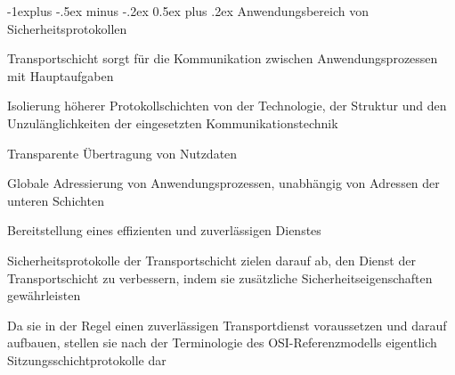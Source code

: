 \documentclass[a4paper]{article}
\makeatletter
\renewcommand{\subsection}{\@startsection{subsection}{2}{0mm}%
 {-1explus -.5ex minus -.2ex}%
 {0.5ex plus .2ex}%
 {\normalfont\normalsize\bfseries}}
\makeatother
\begin{document}
\begin{multicols}{3}
      \subsection{Anwendungsbereich von Sicherheitsprotokollen}
      \begin{itemize*}
            \item Transportschicht sorgt für die Kommunikation zwischen Anwendungsprozessen mit Hauptaufgaben
            \begin{itemize*}
                  \item Isolierung höherer Protokollschichten von der Technologie, der Struktur und den Unzulänglichkeiten der eingesetzten Kommunikationstechnik
                  \item Transparente Übertragung von Nutzdaten
                  \item Globale Adressierung von Anwendungsprozessen, unabhängig von Adressen der unteren Schichten %
                  \item Bereitstellung eines effizienten und zuverlässigen Dienstes
            \end{itemize*}
            \item Sicherheitsprotokolle der Transportschicht zielen darauf ab, den Dienst der Transportschicht zu verbessern, indem sie zusätzliche Sicherheitseigenschaften gewährleisten
            \item Da sie in der Regel einen zuverlässigen Transportdienst voraussetzen und darauf aufbauen, stellen sie nach der Terminologie des OSI-Referenzmodells eigentlich Sitzungsschichtprotokolle dar
      \end{itemize*}


\end{multicols}
\end{document}
